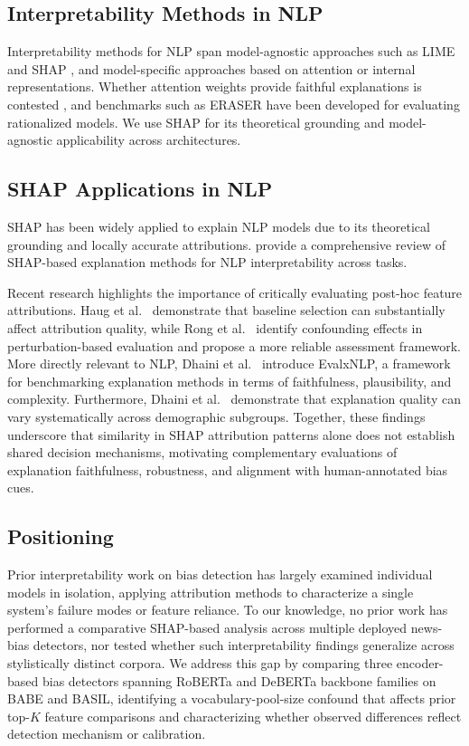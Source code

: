 \documentclass[11pt]{article}
\begin{document}
\subsection{Interpretability Methods in NLP}
Interpretability methods for NLP span model-agnostic approaches such 
as LIME \cite{ribeiro2016whyitrustyou} and SHAP 
\cite{lundberg2017unifiedapproachinterpretingmodel}, and model-specific 
approaches based on attention or internal representations. Whether 
attention weights provide faithful explanations is contested 
\cite{jain2019attentionexplanation, wiegreffe2019attentionexplanation, 
serrano2019attentioninterpretable}, and benchmarks such as ERASER 
\cite{deyoung2020eraserbenchmarkevaluaterationalized} have been 
developed for evaluating rationalized models. We use SHAP for its 
theoretical grounding and model-agnostic applicability across 
architectures.

\subsection{SHAP Applications in NLP}
SHAP has been widely applied to explain NLP models due to its 
theoretical grounding and locally accurate attributions. 
\citet{Mosca2022SHAPBasedEM} provide a comprehensive review of 
SHAP-based explanation methods for NLP interpretability across tasks.

Recent research highlights the importance of critically
evaluating post-hoc feature attributions. Haug et
al.~\citep{haug2021baselines} demonstrate that baseline
selection can substantially affect attribution quality,
while Rong et al.~\citep{rong2022road} identify
confounding effects in perturbation-based evaluation
and propose a more reliable assessment framework.
More directly relevant to NLP, Dhaini et
al.~\citep{dhaini2025evalxnlp} introduce EvalxNLP,
a framework for benchmarking explanation methods
in terms of faithfulness, plausibility, and complexity.
Furthermore, Dhaini et al.~\citep{dhaini2025gender}
demonstrate that explanation quality can vary
systematically across demographic subgroups.
Together, these findings underscore that similarity
in SHAP attribution patterns alone does not establish
shared decision mechanisms, motivating complementary
evaluations of explanation faithfulness, robustness,
and alignment with human-annotated bias cues.

\subsection{Positioning}
Prior interpretability work on bias detection has largely examined 
individual models in isolation, applying attribution methods to 
characterize a single system's failure modes or feature reliance. 
To our knowledge, no prior work has performed a comparative SHAP-based 
analysis across multiple deployed news-bias detectors, nor tested 
whether such interpretability findings generalize across stylistically 
distinct corpora. We address this gap 
by comparing three encoder-based bias detectors spanning RoBERTa and 
DeBERTa backbone families on BABE and BASIL, identifying a 
vocabulary-pool-size confound that affects prior top-$K$ feature 
comparisons and characterizing whether observed differences reflect 
detection mechanism or calibration.
\end{document}
